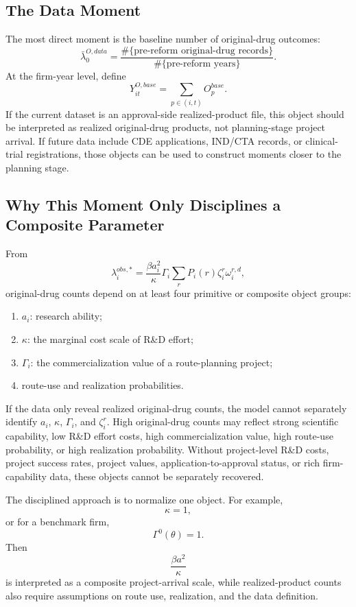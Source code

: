 \documentclass[12pt]{article}
\newcommand{\1}{\mathbf{1}}
\begin{document}
\subsection{The Data Moment}

The most direct moment is the baseline number of original-drug outcomes:
\[
    \bar\lambda_0^{O,data}
    =
    \frac{\#\{\text{pre-reform original-drug records}\}}
    {\#\{\text{pre-reform years}\}}.
\]
At the firm-year level, define
\[
    Y_{it}^{O,base}=\sum_{p\in(i,t)}O_p^{base}.
\]
If the current dataset is an approval-side realized-product file, this object should be interpreted as realized original-drug products, not planning-stage project arrival. If future data include CDE applications, IND/CTA records, or clinical-trial registrations, those objects can be used to construct moments closer to the planning stage.

\subsection{Why This Moment Only Disciplines a Composite Parameter}

From
\[
    \lambda_i^{obs,*}=
    \frac{\beta a_i^2}{\kappa}\Gamma_i
    \sum_rP_i(r)\zeta_i^r\omega_i^{r,d},
\]
original-drug counts depend on at least four primitive or composite object groups:
\begin{enumerate}[label=(\roman*),leftmargin=2em]
    \item $a_i$: research ability;
    \item $\kappa$: the marginal cost scale of R\&D effort;
    \item $\Gamma_i$: the commercialization value of a route-planning project;
    \item route-use and realization probabilities.
\end{enumerate}

If the data only reveal realized original-drug counts, the model cannot separately identify $a_i$, $\kappa$, $\Gamma_i$, and $\zeta_i^r$. High original-drug counts may reflect strong scientific capability, low R\&D effort costs, high commercialization value, high route-use probability, or high realization probability. Without project-level R\&D costs, project success rates, project values, application-to-approval status, or rich firm-capability data, these objects cannot be separately recovered.

The disciplined approach is to normalize one object. For example,
\[
    \kappa=1,
\]
or for a benchmark firm,
\[
    \Gamma^0(\theta)=1.
\]
Then
\[
    \frac{\beta a^2}{\kappa}
\]
is interpreted as a composite project-arrival scale, while realized-product counts also require assumptions on route use, realization, and the data definition.
\end{document}
